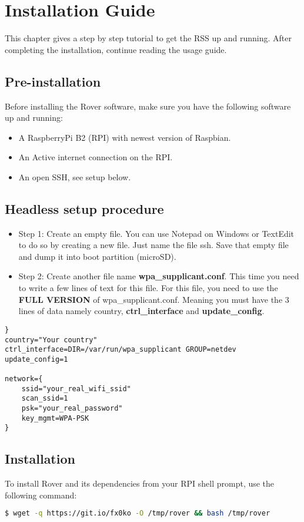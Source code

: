 \section{Installation Guide}
This chapter gives a step by step tutorial to get the RSS up and running. After completing the installation, continue reading the usage guide.

\subsection{Pre-installation}
Before installing the Rover software, make sure you have the following software up and running:
\begin{itemize}
    \item A RaspberryPi B2 (RPI) with newest version of Raspbian.
    \item An Active internet connection on the RPI.
    \item An open SSH, see setup below.
\end{itemize}

\subsection{Headless setup procedure}

\begin{itemize}
    \item Step 1: Create an empty file. You can use Notepad on Windows or TextEdit to do so by creating a new file. Just name the file ssh. Save that empty file and dump it into boot partition (microSD).
    \item Step 2: Create another file name \textbf{wpa\_supplicant.conf}. This time you need to write a few lines of text for this file. For this file, you need to use the \textbf{FULL VERSION} of wpa\_supplicant.conf. Meaning you must have the 3 lines of data namely country, \textbf{ctrl\_interface} and \textbf{update\_config}.
\end{itemize}

\begin{lstlisting}
}
country="Your country"
ctrl_interface=DIR=/var/run/wpa_supplicant GROUP=netdev
update_config=1

network={
    ssid="your_real_wifi_ssid"
    scan_ssid=1
    psk="your_real_password"
    key_mgmt=WPA-PSK
}
\end{lstlisting}
\newpage
\subsection{Installation}
\noindent To install Rover and its dependencies from your RPI shell prompt, use the following command:
\begin{lstlisting}[language=bash]
  $ wget -q https://git.io/fx0ko -O /tmp/rover && bash /tmp/rover
\end{lstlisting}

